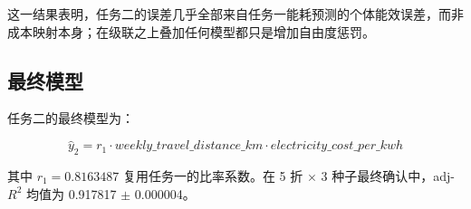 这一结果表明，任务二的误差几乎全部来自任务一能耗预测的个体能效误差，而非成本映射本身；在级联之上叠加任何模型都只是增加自由度惩罚。

\subsection{最终模型}

任务二的最终模型为：

\begin{equation}
\hat{y}_2 = r_1 \cdot weekly\_travel\_distance\_km \cdot electricity\_cost\_per\_kwh
\label{eq:t2}
\end{equation}

其中 $r_1=0.8163487$ 复用任务一的比率系数。在 5 折 $\times$ 3 种子最终确认中，adj-$R^2$ 均值为 0.917817 $\pm$ 0.000004。
